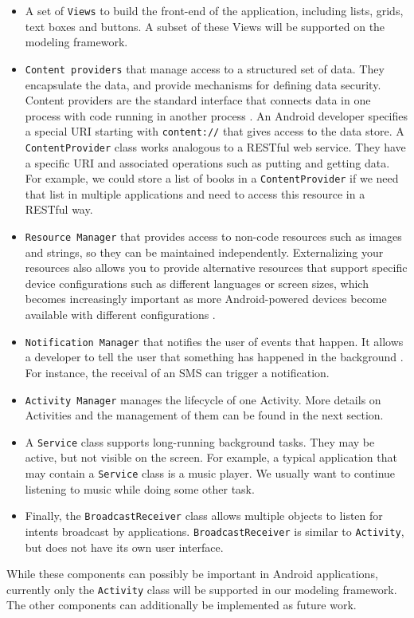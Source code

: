 \begin{itemize}
\item{A set of \texttt{Views} to build the front-end of the application, including lists, grids, text boxes and buttons. A subset of these Views will be supported on the modeling framework.}
\item{\texttt{Content providers} that manage access to a structured set of data. They encapsulate the data, and provide mechanisms for defining data security. Content providers are the standard interface that connects data in one process with code running in another process \cite{ContentProviders}. An Android developer specifies a special URI starting with \texttt{content://} that gives access to the data store. A \texttt{ContentProvider} class works analogous to a RESTful web service. They have a specific URI and associated operations such as putting and getting data. For example, we could store a list of books in a \texttt{ContentProvider} if we need that list in multiple applications and need to access this resource in a RESTful way.}
\item{\texttt{Resource Manager} that provides access to non-code resources such as images and strings, so they can be maintained independently.  Externalizing your resources also allows you to provide alternative resources that support specific device configurations such as different languages or screen sizes, which becomes increasingly important as more Android-powered devices become available with different configurations \cite{AppResources}.}
\item{\texttt{Notification Manager} that notifies the user of events that happen. It allows a developer to tell the user that something has happened in the background \cite{NotificationManager}. For instance, the receival of an SMS can trigger a notification.}
\item{\texttt{Activity Manager} manages the lifecycle of one Activity. More details on Activities and the management of them can be found in the next section.}
\item{A \texttt{Service} class supports long-running background tasks. They may be active, but not visible on the screen. For example, a typical application that may contain a \texttt{Service} class is a music player. We usually want to continue listening to music while doing some other task.}
\item{Finally, the \texttt{BroadcastReceiver} class allows multiple objects to listen for intents broadcast by applications. \texttt{BroadcastReceiver} is similar to \texttt{Activity}, but does not have its own user interface.}
\end{itemize}
While these components can possibly be important in Android applications, currently only the \texttt{Activity} class will be supported in our modeling framework. The other components can additionally be implemented as future work.

